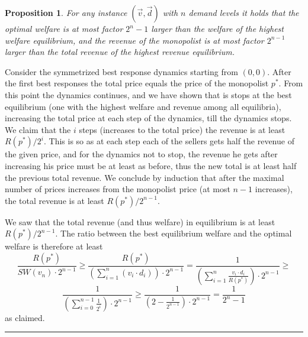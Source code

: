 \documentclass[11pt,a4paper]{article}
\newcommand{\qed}{\rule{1.5mm}{2mm}\vspace{0.1in}}
\newenvironment{proof}{\par\noindent{\bf Proof:}}{\qed}
\newtheorem{proposition}[theorem]{Proposition}
\begin{document}
\begin{proposition}
	For any instance $(\vec{v},\vec{d})$ with $n$ demand levels it holds that  the optimal welfare is at most factor $2^n -1$ larger than the welfare of the highest welfare equilibrium, and the revenue of the monopolist is at most factor $2^{n-1}$ larger than the total revenue of the highest revenue equilibrium.
\end{proposition}
\begin{proof}
	Consider the symmetrized best response dynamics starting from $(0,0)$. After the first best responses the total price equals the price of the monopolist $p^*$. From this point the dynamics continues, and we have shown that is stops at the best equilibrium (one with the highest welfare and revenue among all equilibria), increasing the total price at each step of the dynamics, till the dynamics stops.
	We claim that the $i$ steps (increases to the total price) the revenue is at least $R(p^*)/2^i$. This is so as at each step each of the sellers gets half the revenue of the given price, and for the dynamics not to stop, the revenue he gets after increasing his price must be at least as before, thus the new total is at least half the previous total revenue. We conclude by induction that after the maximal number of prices increases from the monopolist price (at most $n-1$ increases), the total revenue is at least $R(p^*)/2^{n-1}$.
	
	
	We saw that the total revenue (and thus welfare) in equilibrium is at least  $R(p^*)/2^{n-1}$. %
	The ratio between the best equilibrium welfare and the optimal welfare is therefore at least
	$$\frac{R(p^*)}{SW(v_n)\cdot 2^{n-1}}\geq \frac{R(p^*)}{\left(\sum_{i=1}^n (v_i \cdot d_{i})\right)\cdot 2^{n-1}}=
	\frac{1}{\left(\sum_{i=1}^n \frac{v_i \cdot d_{i}}{R(p^*)}\right)\cdot 2^{n-1}}\geq $$
	$$\frac{1}{\left(\sum_{i=0}^{n-1} \frac{1}{2^i}\right)\cdot 2^{n-1}}\geq
	\frac{1}{\left(2-\frac{1}{2^{n-1}}\right)\cdot 2^{n-1}}=
	\frac{1}{2^{n}-1}$$
	as claimed.
\end{proof}
\end{document}
